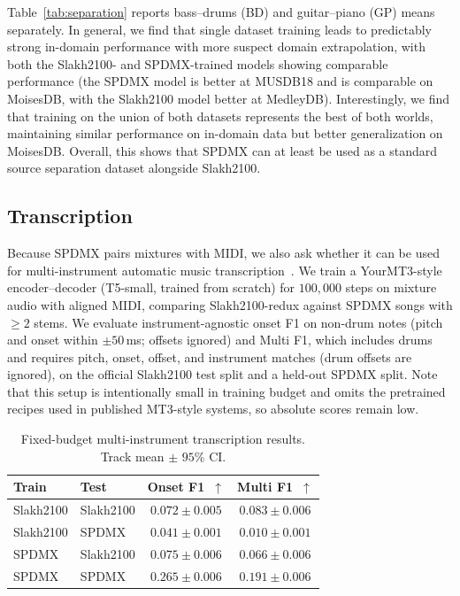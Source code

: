 \documentclass{article}
\begin{document}
Table~\ref{tab:separation} reports bass--drums (BD) and guitar--piano (GP) means separately.
In general, we find that single dataset training leads to predictably strong in-domain performance with more suspect domain extrapolation, with both the Slakh2100- and SPDMX-trained models showing comparable performance (the SPDMX model is better at MUSDB18 and is comparable on MoisesDB, with the Slakh2100 model better at MedleyDB).
Interestingly, we find that training on the union of both datasets represents the best of both worlds, maintaining similar performance on in-domain data but better generalization on MoisesDB.
Overall, this shows that SPDMX can at least be used as a standard source separation dataset alongside Slakh2100.

\vspace{-0.8em}

\subsection{Transcription}
\label{ssec:transcription}

Because SPDMX pairs mixtures with MIDI, we also ask whether it can be used for multi-instrument automatic music transcription~\cite{gardner2022mt3,chang2024yourmt3}.
We train a YourMT3-style encoder--decoder (T5-small, trained from scratch) for $100{,}000$ steps on mixture audio with aligned MIDI, comparing Slakh2100-redux against SPDMX songs with $\geq 2$ stems.
We evaluate instrument-agnostic onset F1 on non-drum notes (pitch and onset within $\pm 50$\,ms; offsets ignored) and Multi F1, which includes drums and requires pitch, onset, offset, and instrument matches (drum offsets are ignored), on the official Slakh2100 test split and a held-out SPDMX split.
Note that this setup is intentionally small in training budget and omits the pretrained recipes used in published MT3-style systems, so absolute scores remain low.

\begin{table}[t]
\centering
\caption{Fixed-budget multi-instrument transcription results.
Track mean $\pm$ $95$\% CI.}
\label{tab:transcription}
\begin{tabular}{ll|cc}
\toprule
\textbf{Train} & \textbf{Test} & \textbf{Onset F1}~$\uparrow$ & \textbf{Multi F1}~$\uparrow$ \\
\midrule
Slakh2100 & Slakh2100 & $0.072{\pm}0.005$ & $0.083{\pm}0.006$ \\
Slakh2100 & SPDMX & $0.041{\pm}0.001$ & $0.010{\pm}0.001$ \\
SPDMX & Slakh2100 & $0.075{\pm}0.006$ & $0.066{\pm}0.006$ \\
SPDMX & SPDMX & $\mathbf{0.265{\pm}0.006}$ & $\mathbf{0.191{\pm}0.006}$ \\
\bottomrule
\end{tabular}
\end{table}
\end{document}
